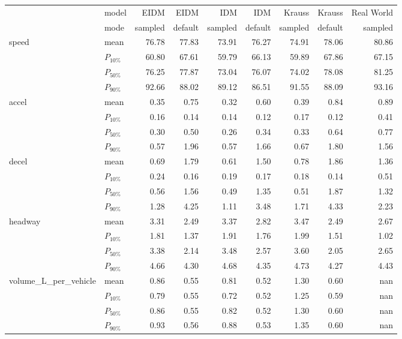 \begin{tabular}{llrrrrrrr}
 & model & EIDM & EIDM  & IDM & IDM  & Krauss & Krauss  & Real World \\
 & mode & sampled &  default & sampled &  default & sampled &  default & sampled \\
\multirow[c]{4}{*}{speed} & mean & 76.78 & 77.83 & 73.91 & 76.27 & 74.91 & 78.06 & 80.86 \\
 & $P_{10\%}$ & 60.80 & 67.61 & 59.79 & 66.13 & 59.89 & 67.86 & 67.15 \\
 & $P_{50\%}$ & 76.25 & 77.87 & 73.04 & 76.07 & 74.02 & 78.08 & 81.25 \\
 & $P_{90\%}$ & 92.66 & 88.02 & 89.12 & 86.51 & 91.55 & 88.09 & 93.16 \\
\multirow[c]{4}{*}{accel} & mean & 0.35 & 0.75 & 0.32 & 0.60 & 0.39 & 0.84 & 0.89 \\
 & $P_{10\%}$ & 0.16 & 0.14 & 0.14 & 0.12 & 0.17 & 0.12 & 0.41 \\
 & $P_{50\%}$ & 0.30 & 0.50 & 0.26 & 0.34 & 0.33 & 0.64 & 0.77 \\
 & $P_{90\%}$ & 0.57 & 1.96 & 0.57 & 1.66 & 0.67 & 1.80 & 1.56 \\
\multirow[c]{4}{*}{decel} & mean & 0.69 & 1.79 & 0.61 & 1.50 & 0.78 & 1.86 & 1.36 \\
 & $P_{10\%}$ & 0.24 & 0.16 & 0.19 & 0.17 & 0.18 & 0.14 & 0.51 \\
 & $P_{50\%}$ & 0.56 & 1.56 & 0.49 & 1.35 & 0.51 & 1.87 & 1.32 \\
 & $P_{90\%}$ & 1.28 & 4.25 & 1.11 & 3.48 & 1.71 & 4.33 & 2.23 \\
\multirow[c]{4}{*}{headway} & mean & 3.31 & 2.49 & 3.37 & 2.82 & 3.47 & 2.49 & 2.67 \\
 & $P_{10\%}$ & 1.81 & 1.37 & 1.91 & 1.76 & 1.99 & 1.51 & 1.02 \\
 & $P_{50\%}$ & 3.38 & 2.14 & 3.48 & 2.57 & 3.60 & 2.05 & 2.65 \\
 & $P_{90\%}$ & 4.66 & 4.30 & 4.68 & 4.35 & 4.73 & 4.27 & 4.43 \\
\multirow[c]{4}{*}{volume_L_per_vehicle} & mean & 0.86 & 0.55 & 0.81 & 0.52 & 1.30 & 0.60 & nan \\
 & $P_{10\%}$ & 0.79 & 0.55 & 0.72 & 0.52 & 1.25 & 0.59 & nan \\
 & $P_{50\%}$ & 0.86 & 0.55 & 0.82 & 0.52 & 1.30 & 0.60 & nan \\
 & $P_{90\%}$ & 0.93 & 0.56 & 0.88 & 0.53 & 1.35 & 0.60 & nan \\
\end{tabular}
